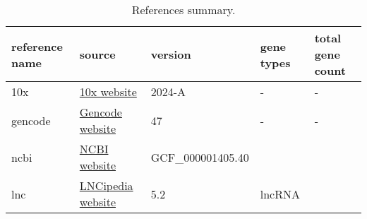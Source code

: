 \begin{table}[htbp]
  \centering
  \begin{tabular}{l|llll}
    \toprule
    reference name & source & version & gene types & total gene count  \\
    \midrule
    10x & \href{https://www.10xgenomics.com/support/software/cell-ranger/downloads#reference-downloads}{10x website} & 2024-A & - & - \\
    gencode & \href{https://www.gencodegenes.org/human/}{Gencode website} & 47 & - & - \\
    ncbi & \href{https://ftp.ncbi.nlm.nih.gov/genomes/refseq/vertebrate_mammalian/Homo_sapiens/latest_assembly_versions/GCF_000001405.40_GRCh38.p14/}{NCBI website} & GCF\_000001405.40 &  & \\
    lnc & \href{https://lncipedia.org/download}{LNCipedia website} & 5.2 & lncRNA & \\
    \bottomrule
  \end{tabular}
  \caption{References summary.}
  \label{tab:references}
\end{table}
